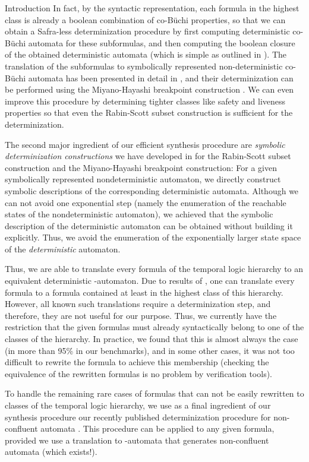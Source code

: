 \documentclass[copyright,creativecommons]{eptcs}
\begin{document}
\begin{section}{Introduction}
In fact, by the syntactic representation, each formula in the highest class is already a boolean combination of co-Büchi properties, so that we can obtain a Safra-less determinization procedure by first computing deterministic co-Büchi automata for these subformulas, and then computing the boolean closure of the obtained deterministic automata (which is simple as outlined in \cite{Schn03}). The translation of the subformulas to symbolically represented non-deterministic co-Büchi automata has been presented in detail in \cite{Schn01b,Schn03}, and their determinization can be performed using the Miyano-Hayashi breakpoint construction \cite{MiHa84,Schn03}. We can even improve this procedure by determining tighter classes like safety and liveness properties so that even the Rabin-Scott subset construction is sufficient for the determinization.

The second major ingredient of our efficient synthesis procedure are \emph{symbolic determinization constructions} we have developed in \cite{MoSL08} for the Rabin-Scott subset construction \cite{RaSc59} and the Miyano-Hayashi breakpoint construction: For a given symbolically represented nondeterministic automaton, we directly construct symbolic descriptions of the corresponding deterministic automata. Although we can not avoid one exponential step (namely the enumeration of the reachable states of the nondeterministic automaton), we achieved that the symbolic description of the deterministic automaton can be obtained without building it explicitly. Thus, we avoid the enumeration of the exponentially larger state space of the \emph{deterministic} automaton.

Thus, we are able to translate every formula of the temporal logic hierarchy to an equivalent deterministic -automaton. Due to results of \cite{ChMP92}, one can translate every  formula to a formula contained at least in the highest class of this hierarchy. However, all known such translations require a determinization step, and therefore, they are not useful for our purpose. Thus, we currently have the restriction that the given  formulas must already syntactically belong to one of the classes of the hierarchy. In practice, we found that this is almost always the case (in more than 95\% in our benchmarks), and in some other cases, it was not too difficult to rewrite the formula to achieve this membership (checking the equivalence of the rewritten  formulas is no problem by verification tools).

To handle the remaining rare cases of formulas that can not be easily rewritten to classes of the temporal logic hierarchy, we use as a final ingredient of our synthesis procedure our recently published determinization procedure for non-confluent automata \cite{MoSc08}. This procedure can be applied to any given  formula, provided we use a translation to -automata that generates non-confluent automata (which exists!).


\end{section}
\end{document}
